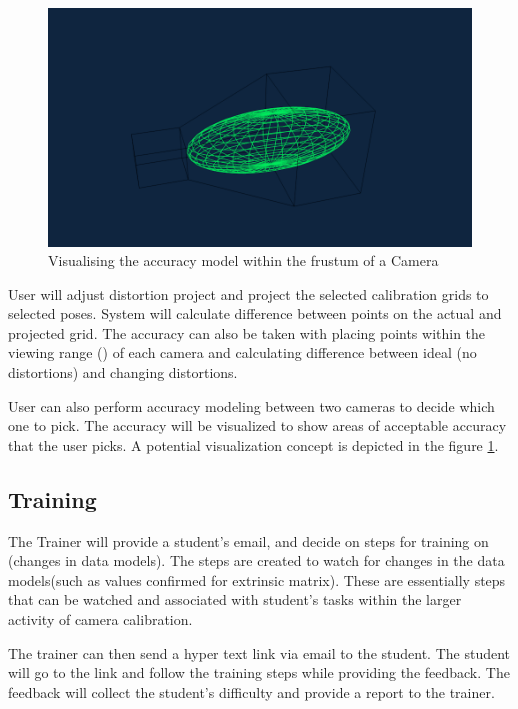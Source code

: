 \documentclass[11pt]{report}
\begin{document}

\begin{figure}[htp]
\centering
\includegraphics[scale=0.50]{images/accuracy_vizulization.png}
\caption{Visualising the accuracy model within the frustum of a Camera }
\label{fig:av}
\end{figure}


User will adjust distortion project and project the selected calibration grids to selected poses. System will calculate difference between points on the actual and projected grid. 
The accuracy can also be taken with placing points within the viewing range () of each camera and calculating difference between ideal (no distortions) and changing distortions. 

User can also perform accuracy modeling between two cameras to decide which one to pick. The accuracy will be visualized to show areas of acceptable accuracy that the user picks. A potential visualization concept is depicted in the figure \ref{fig:av}. 


\subsection{Training} 

The Trainer will provide a student's email, and decide on steps for training on (changes in data models). The steps are created to watch for changes in the data models(such as values confirmed for extrinsic matrix). These are essentially steps that can be watched and associated with student's tasks within the larger activity of camera calibration. 

The trainer can then send a hyper text link via email to the student. The student  will go to the link and follow the training steps while providing the feedback. The feedback will collect the student's difficulty and provide a report to the trainer. 
\end{document}
